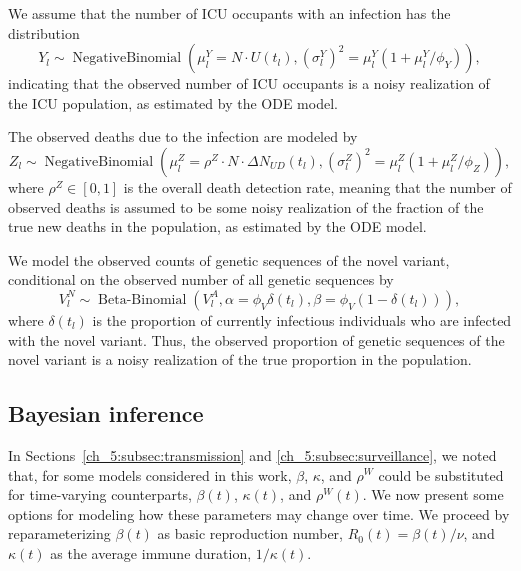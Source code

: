 We assume that the number of ICU occupants with an infection has the distribution
\begin{equation}
Y_l \sim \operatorname{Negative Binomial} \left( \mu^{Y}_l = N \cdot U \left( t_l \right), \left(\sigma^Y_l\right)^{2} = \mu^{Y}_l \left( 1 + \mu^{Y}_l / \phi_Y \right) \right),
\label{ch_5:eqn:icu_emission}
\end{equation}
indicating that the observed number of ICU occupants is a noisy realization of the ICU population, as estimated by the ODE model.

The observed deaths due to the infection are modeled by
\begin{equation}
Z_l \sim \operatorname{Negative Binomial} \left( \mu^{Z}_l = \rho^Z \cdot N \cdot \Delta N_{UD} \left( t_l \right), \left(\sigma^Z_l\right)^{2} = \mu^{Z}_l \left( 1 + \mu^{Z}_l / \phi_Z \right) \right),
\label{ch_5:eqn:death_emission}
\end{equation}
where \( \rho^Z \in [0,1]\) is the overall death detection rate, meaning that the number of observed deaths is assumed to be some noisy realization of the fraction of the true new deaths in the population, as estimated by the ODE model.

We model the observed counts of genetic sequences of the novel variant, conditional on the observed number of all genetic sequences by
\begin{equation}
V^N_l \sim \operatorname{Beta-Binomial} \left( V^A_l, \alpha = \phi_V \delta \left( t_l \right), \beta = \phi_V \left( 1 -  \delta \left( t_l \right) \right) \right),
\label{ch_5:eqn:novel_variant_emission}
\end{equation}
where \( \delta \left( t_l \right) \) is the proportion of currently infectious individuals who are infected with the novel variant.
Thus, the observed proportion of genetic sequences of the novel variant is a noisy realization of the true proportion in the population.

\subsection{Bayesian inference}
\label{ch_5:subsec:bayesian}

In Sections~\ref{ch_5:subsec:transmission} and \ref{ch_5:subsec:surveillance}, we noted that, for some models considered in this work, \( \beta \), \( \kappa \), and \( \rho^W \) could be substituted for time-varying counterparts, \( \beta(t) \), \( \kappa(t) \), and \( \rho^W(t) \).
We now present some options for modeling how these parameters may change over time.
We proceed by reparameterizing \( \beta(t) \) as  basic reproduction number, \( R_0(t) = \beta(t) / \nu \), and \( \kappa(t) \) as the average immune duration, \( 1 / \kappa(t) \).

